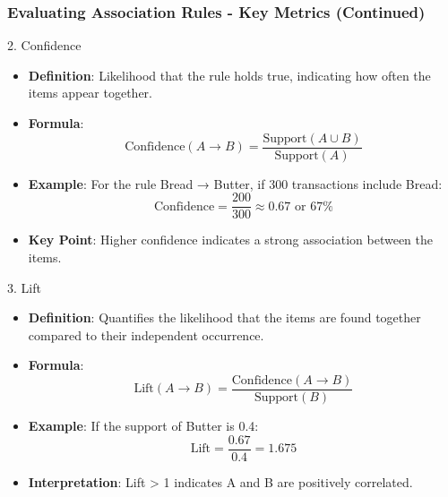 \documentclass[aspectratio=169]{beamer}
\begin{document}
\begin{frame}[fragile]
    \frametitle{Evaluating Association Rules - Key Metrics (Continued)}
    \begin{block}{2. Confidence}
        \begin{itemize}
            \item \textbf{Definition}: Likelihood that the rule holds true, indicating how often the items appear together.
            \item \textbf{Formula}:
            \begin{equation}
                \text{Confidence}(A \rightarrow B) = \frac{\text{Support}(A \cup B)}{\text{Support}(A)}
            \end{equation}
            \item \textbf{Example}: For the rule {Bread} → {Butter}, if 300 transactions include Bread:
            \begin{equation}
                \text{Confidence} = \frac{200}{300} \approx 0.67 \text{ or } 67\%
            \end{equation}
            \item \textbf{Key Point}: Higher confidence indicates a strong association between the items.
        \end{itemize}
    \end{block}

    \begin{block}{3. Lift}
        \begin{itemize}
            \item \textbf{Definition}: Quantifies the likelihood that the items are found together compared to their independent occurrence.
            \item \textbf{Formula}:
            \begin{equation}
                \text{Lift}(A \rightarrow B) = \frac{\text{Confidence}(A \rightarrow B)}{\text{Support}(B)}
            \end{equation}
            \item \textbf{Example}: If the support of Butter is 0.4:
            \begin{equation}
                \text{Lift} = \frac{0.67}{0.4} = 1.675
            \end{equation}
            \item \textbf{Interpretation}: Lift > 1 indicates A and B are positively correlated.
        \end{itemize}
    \end{block}
\end{frame}
\end{document}
